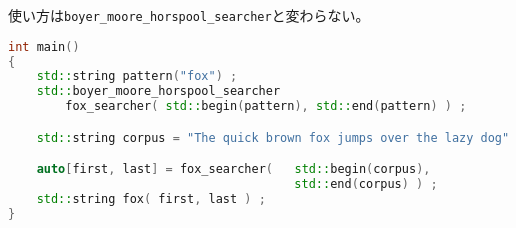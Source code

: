 使い方は\lstinline!boyer_moore_horspool_searcher!と変わらない。

\begin{lstlisting}[language=C++]
int main()
{
    std::string pattern("fox") ;
    std::boyer_moore_horspool_searcher
        fox_searcher( std::begin(pattern), std::end(pattern) ) ;

    std::string corpus = "The quick brown fox jumps over the lazy dog" ;

    auto[first, last] = fox_searcher(   std::begin(corpus),
                                        std::end(corpus) ) ;
    std::string fox( first, last ) ;
}
\end{lstlisting}

